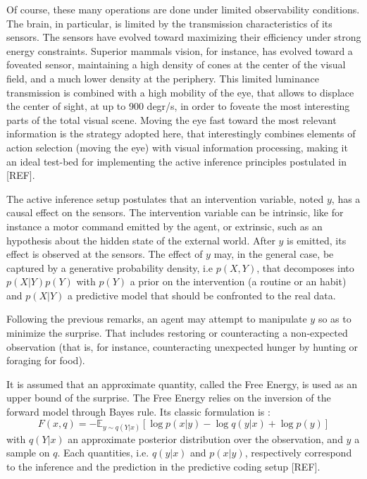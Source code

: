 \documentclass[runningheads]{llncs}
\begin{document}
Of course, these many operations are done under limited observability conditions. The brain, in particular, is limited by the transmission characteristics of its sensors. The sensors have evolved toward maximizing their efficiency under strong energy constraints. Superior mammals vision, for instance, has evolved toward a foveated sensor, maintaining a high density of cones at the center of the visual field, and a much lower density at the periphery. This limited luminance transmission is combined with a high mobility of the eye, that allows to displace the center of sight, at up to 900 degr/s, in order to foveate the most interesting parts of the total visual scene. Moving the eye fast toward the most relevant information is the strategy adopted here, that interestingly combines elements of action selection (moving the eye) with visual information processing, making it an ideal test-bed for implementing the active inference principles postulated in [REF].


The active inference setup postulates that an intervention variable, noted $y$, has a causal effect on the sensors. The intervention variable can be intrinsic, like for instance a motor command emitted by the agent, or extrinsic, such as an hypothesis about the hidden state of the external world. After $y$ is emitted, its effect is observed at the sensors. The effect of $y$ may, in the general case, be captured by a generative probability density, i.e $p(X,Y)$, that decomposes into $p(X|Y)p(Y)$ with $p(Y)$ a prior on the intervention (a routine or an habit) and $p(X|Y)$ a predictive model that should be confronted to the real data. 


Following the previous remarks, an agent may attempt to manipulate $y$ so as to minimize the surprise. That includes  restoring or counteracting a non-expected observation (that is, for instance, counteracting unexpected hunger by hunting or foraging for food). 

It is assumed that an approximate quantity, called the Free Energy, is used as an upper bound of the surprise. The Free Energy relies on the inversion of the forward model through Bayes rule. Its classic formulation is :
$$F(x,q) = - \mathbb{E}_{y \sim q(Y|x)} [\log p(x|y) - \log q(y|x) + \log p(y)]$$
with $q(Y|x)$ an approximate posterior distribution over the observation, and $y$ a sample on $q$. Each quantities, i.e. $q(y|x)$ and $p(x|y)$, respectively correspond to the inference and the prediction in the predictive coding setup [REF]. 
\end{document}
